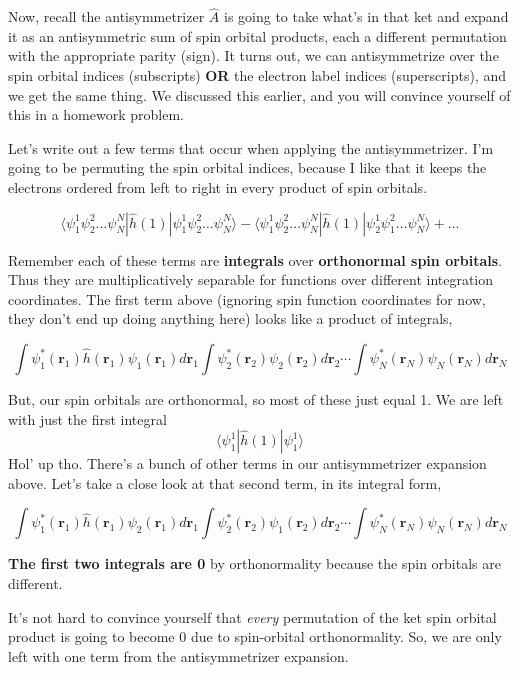 \documentclass[11pt]{article}
\begin{document}
Now, recall the antisymmetrizer \(\hat{A}\) is going to take what's in
that ket and expand it as an antisymmetric sum of spin orbital products,
each a different permutation with the appropriate parity (sign). It
turns out, we can antisymmetrize over the spin orbital indices
(subscripts) \textbf{OR} the electron label indices (superscripts), and
we get the same thing. We discussed this earlier, and you will convince
yourself of this in a homework problem.

Let's write out a few terms that occur when applying the
antisymmetrizer. I'm going to be permuting the spin orbital indices,
because I like that it keeps the electrons ordered from left to right in
every product of spin orbitals.

\[\langle \psi_1^1 \psi_2^2 \dots \psi_N^N | \hat{h}(1) |\psi_1^1 \psi_2^2 \dots \psi_N^N  \rangle - \langle \psi_1^1 \psi_2^2 \dots \psi_N^N | \hat{h}(1) |\psi_2^1 \psi_1^2 \dots \psi_N^N  \rangle  + ... \]

Remember each of these terms are \textbf{integrals} over
\textbf{orthonormal spin orbitals}. Thus they are multiplicatively
separable for functions over different integration coordinates. The
first term above (ignoring spin function coordinates for now, they don't
end up doing anything here) looks like a product of integrals,

\[\int \psi_1^{*}(\boldsymbol{r}_1) \hat{h}(\boldsymbol{r}_1) \psi_1(\boldsymbol{r}_1) d\boldsymbol{r}_1 \int \psi_2^{*}(\boldsymbol{r}_2)\psi_2(\boldsymbol{r}_2) d\boldsymbol{r}_2 \cdots \int \psi_N^*(\boldsymbol{r}_N)\psi_N(\boldsymbol{r}_N) d\boldsymbol{r}_N \]

But, our spin orbitals are orthonormal, so most of these just equal 1.
We are left with just the first integral
\[ \langle \psi_1^1 | \hat{h}(1) | \psi_1^1 \rangle \] Hol' up tho.
There's a bunch of other terms in our antisymmetrizer expansion above.
Let's take a close look at that second term, in its integral form,

\[\int \psi_1^{*}(\boldsymbol{r}_1) \hat{h}(\boldsymbol{r}_1) \psi_2(\boldsymbol{r}_1) d\boldsymbol{r}_1 \int \psi_2^{*}(\boldsymbol{r}_2)\psi_1(\boldsymbol{r}_2) d\boldsymbol{r}_2 \cdots \int \psi_N^*(\boldsymbol{r}_N)\psi_N(\boldsymbol{r}_N) d\boldsymbol{r}_N \]

\textbf{The first two integrals are 0} by orthonormality because the
spin orbitals are different.

It's not hard to convince yourself that \emph{every} permutation of the
ket spin orbital product is going to become 0 due to spin-orbital
orthonormality. So, we are only left with one term from the
antisymmetrizer expansion.
\end{document}
